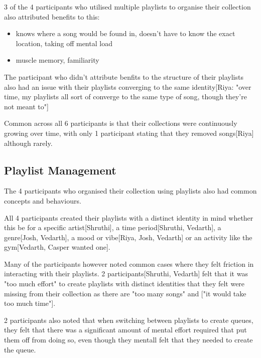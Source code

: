 3 of the 4 participants who utilised multiple playlists to organise their collection also attributed benefits to this:\begin{itemize}
    \item knows where a song would be found in, doesn't have to know the exact location, taking off mental load
    \item muscle memory, familiarity
\end{itemize}
The participant who didn't attribute benfits to the structure of their playlists also had an issue with their playlists converging to the same identity[Riya: "over time, my playlists all sort of converge to the same type of song, though they're not meant to"]

Common across all 6 participants is that their collections were continuously growing over time, with only 1 participant stating that they removed songs[Riya] although rarely. %

\subsection{Playlist Management}
The 4 participants who organised their collection using playlists also had common concepts and behaviours.

All 4 participants created their playlists with a distinct identity in mind whether this be for a specific artist[Shruthi], a time period[Shruthi, Vedarth], a genre[Josh, Vedarth], a mood or vibe[Riya, Josh, Vedarth] or an activity like the gym[Vedarth, Casper wanted one].

Many of the participants however noted common cases where they felt friction in interacting with their playlists. 2 participants[Shruthi, Vedarth] felt that it was "too much effort" to create playlists with distinct identities that they felt were missing from their collection as there are "too many songs" and ["it would take too much time"].

2 participants also noted that when switching between playlists to create queues, they felt that there was a significant amount of mental effort required that put them off from doing so, even though they mentall felt that they needed to create the queue.

